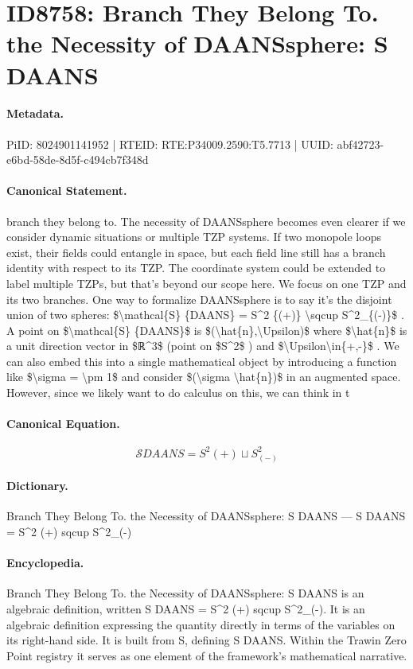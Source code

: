 \section*{ID8758: Branch They Belong To. the Necessity of DAANSsphere: S DAANS}
\paragraph{Metadata.}
PiID: 8024901141952 | RTEID: RTE:P34009.2590:T5.7713 | UUID: abf42723-e6bd-58de-8d5f-c494cb7f348d

\paragraph{Canonical Statement.}
branch they belong to. The necessity of DAANSsphere becomes even clearer if we consider dynamic situations or multiple TZP systems. If two monopole loops exist, their fields could entangle in space, but each field line still has a branch identity with respect to its TZP. The coordinate system could be extended to label multiple TZPs, but that’s beyond our scope here. We focus on one TZP and its two branches. One way to formalize DAANSsphere is to say it’s the disjoint union of two spheres: \$\textbackslash{}mathcal\{S\} \{DAANS\} = S\textasciicircum{}2 \{(+)\} \textbackslash{}sqcup S\textasciicircum{}2\_\{(-)\}\$ . A point on \$\textbackslash{}mathcal\{S\} \{DAANS\}\$ is \$(\textbackslash{}hat\{n\},\textbackslash{}Upsilon)\$ where \$\textbackslash{}hat\{n\}\$ is a unit direction vector in \$ℝ\textasciicircum{}3\$ (point on \$S\textasciicircum{}2\$ ) and \$\textbackslash{}Upsilon\textbackslash{}in\{+,-\}\$ . We can also embed this into a single mathematical object by introducing a function like \$\textbackslash{}sigma = \textbackslash{}pm 1\$ and consider \$(\textbackslash{}sigma \textbackslash{}hat\{n\})\$ in an augmented space. However, since we likely want to do calculus on this, we can think in t

\paragraph{Canonical Equation.}
\[
\mathcal{S} {DAANS} = S^2 {(+)} \sqcup S^2_{(-)}
\]

\paragraph{Dictionary.}
Branch They Belong To. the Necessity of DAANSsphere: S DAANS — S DAANS = S\textasciicircum{}2 (+) sqcup S\textasciicircum{}2\_(-)

\paragraph{Encyclopedia.}
Branch They Belong To. the Necessity of DAANSsphere: S DAANS is an algebraic definition, written S DAANS = S\textasciicircum{}2 (+) sqcup S\textasciicircum{}2\_(-). It is an algebraic definition expressing the quantity directly in terms of the variables on its right-hand side. It is built from S, defining S DAANS. Within the Trawin Zero Point registry it serves as one element of the framework's mathematical narrative.
